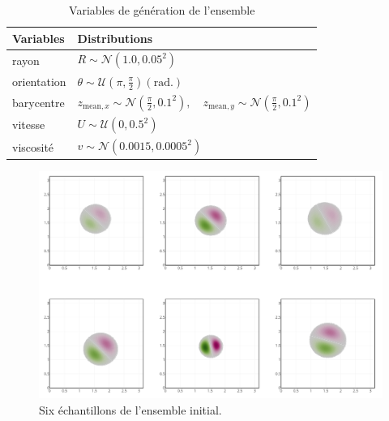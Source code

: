 \begin{table}[htbp]
    \centering
    \caption{Variables de génération de l'ensemble}
    \begin{tabular}[t]{|l|l|}
        \hline
        Variables   & Distributions                                                                                                                                  \\
        \hline
        rayon       & $R \sim \mathcal{N}(1.0, 0.05^2)$                                                                                                              \\
        orientation & $\theta \sim \mathcal{U}\left(\pi, \frac{\pi}{2} \right) (\text{rad.})$                                                                        \\
        barycentre  & $z_{\text{mean},x} \sim \mathcal{N}\left(\frac{\pi}{2},0.1^2\right), \quad z_{\text{mean},y} \sim \mathcal{N}\left(\frac{\pi}{2},0.1^2\right)$ \\
        vitesse     & $U \sim \mathcal{U}(0, 0.5^2)$                                                                                                                 \\
        viscosité   & $v \sim \mathcal{N}(0.0015, 0.0005^2)$                                                                                                         \\
        \hline
    \end{tabular}
    \label{tab:ens_dipole}
\end{table}

\begin{figure}[ht]
    \centering
    \includegraphics[width=0.9\linewidth]{images/app2d/ensemble_sample.png}
    \caption{Six échantillons de l'ensemble initial.}
    \label{fig:sample_ens}
\end{figure}

